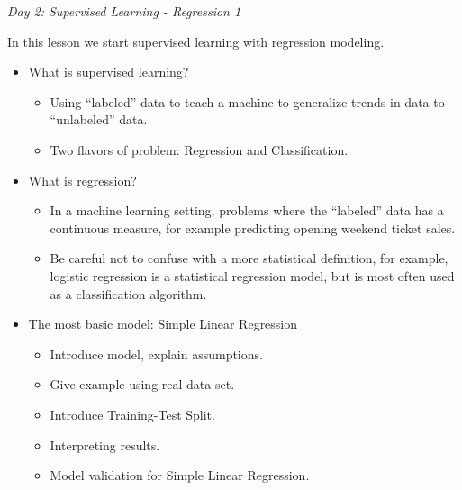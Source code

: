 \documentclass[12pt]{article}
\begin{document}
	
	
	
	
	
	\vspace{2mm}
	\noindent
	\textit{\large{Day 2: Supervised Learning - Regression 1}}
	
	\noindent
	In this lesson we start supervised learning with regression modeling.
	
	\begin{itemize}
		\item What is supervised learning?
			\begin{itemize}
				\item Using ``labeled'' data to teach a machine to generalize trends in data to ``unlabeled'' data.
				\item Two flavors of problem: Regression and Classification.
			\end{itemize}
		\item What is regression?
			\begin{itemize}
				\item In a machine learning setting, problems where the ``labeled'' data has a continuous measure, for example predicting opening weekend ticket sales.
				\item Be careful not to confuse with a more statistical definition, for example, logistic regression is a statistical regression model, but is most often used as a classification algorithm.
			\end{itemize}
		\item The most basic model: Simple Linear Regression
			\begin{itemize}
				\item Introduce model, explain assumptions.
				\item Give example using real data set.
				\item Introduce Training-Test Split.
				\item Interpreting results.
				\item Model validation for Simple Linear Regression.
			\end{itemize}
	\end{itemize}
\end{document}
